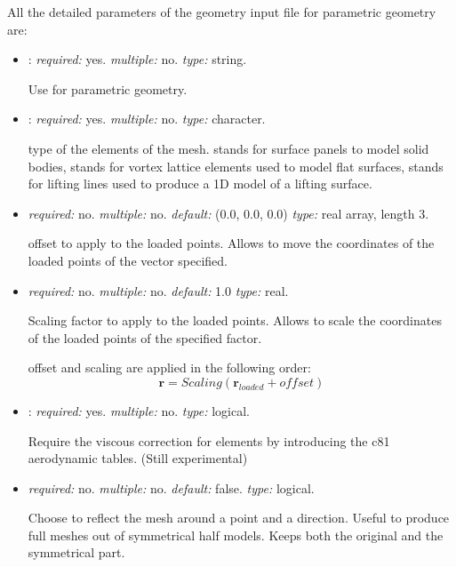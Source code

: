 All the detailed parameters of the geometry input file for parametric geometry are:
\begin{itemize}
\item {}: \textit{required:} yes. \textit{multiple:} no. \textit{type:} string. 

Use  for parametric geometry.

\item {}: \textit{required:} yes. \textit{multiple:} no. \textit{type:} character.

type of the elements of the mesh.  stands for surface panels to model solid bodies, 
 stands for vortex lattice elements used to model flat surfaces,  
stands for lifting lines used to produce a 1D model of a lifting surface. 

\item {} \textit{required:} no. \textit{multiple:} no. 
\textit{default:} (0.0, 0.0, 0.0) \textit{type:} real array, length 3.

offset to apply to the loaded points. Allows to move the coordinates of the loaded points of the vector specified. 

\item {} \textit{required:} no. \textit{multiple:} no. 
\textit{default:} 1.0 \textit{type:} real.

Scaling factor to apply to the loaded points. Allows to scale the coordinates of the loaded points of the specified factor.

offset and scaling are applied in the following order:
\begin{equation*}
\mathbf{r} = Scaling (\mathbf{r}_{loaded}+offset)
\end{equation*}


\item {}: \textit{required:} yes. \textit{multiple:} no. \textit{type:} logical.

Require the viscous correction for  elements by introducing the c81 aerodynamic tables. (Still experimental) 


\item {} \textit{required:} no. \textit{multiple:} no. 
\textit{default:} false. \textit{type:} logical.

Choose to reflect the mesh around a point and a direction. Useful to produce full meshes out of symmetrical half models. 
Keeps both the original and the symmetrical part. 


\end{itemize}
